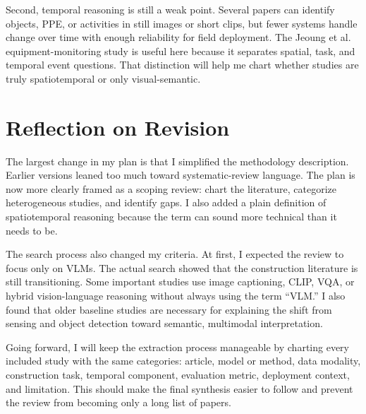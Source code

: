 \documentclass[10pt, letterpaper]{article}
\begin{document}
Second, temporal reasoning is still a weak point. Several papers can identify objects, PPE, or activities in still images or short clips, but fewer systems handle change over time with enough reliability for field deployment. The Jeoung et al. equipment-monitoring study is useful here because it separates spatial, task, and temporal event questions. That distinction will help me chart whether studies are truly spatiotemporal or only visual-semantic.

\section{Reflection on Revision}

The largest change in my plan is that I simplified the methodology description. Earlier versions leaned too much toward systematic-review language. The plan is now more clearly framed as a scoping review: chart the literature, categorize heterogeneous studies, and identify gaps. I also added a plain definition of spatiotemporal reasoning because the term can sound more technical than it needs to be.

The search process also changed my criteria. At first, I expected the review to focus only on VLMs. The actual search showed that the construction literature is still transitioning. Some important studies use image captioning, CLIP, VQA, or hybrid vision-language reasoning without always using the term ``VLM.'' I also found that older baseline studies are necessary for explaining the shift from sensing and object detection toward semantic, multimodal interpretation.

Going forward, I will keep the extraction process manageable by charting every included study with the same categories: article, model or method, data modality, construction task, temporal component, evaluation metric, deployment context, and limitation. This should make the final synthesis easier to follow and prevent the review from becoming only a long list of papers.
\end{document}
